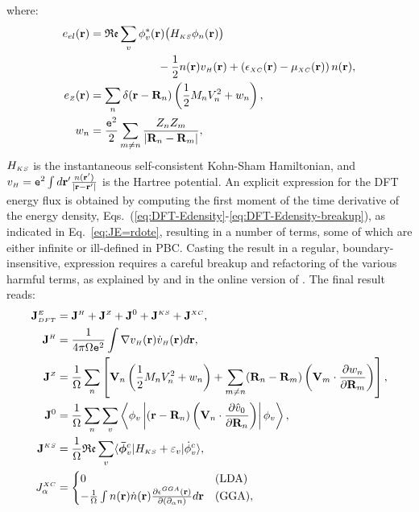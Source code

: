 where:
\begin{align}
  e_{el}(\mathbf{r}) & =\mathfrak{Re} \sum_{v}\phi_{v}^{*}(\mathbf{r})\bigl(H_{\smallKS}\phi_{n}(\mathbf{r})\bigr) \nonumber \\
  & \qquad\qquad\qquad - \frac{1}{2}n(\mathbf{r})v_{\smallH}(\mathbf{r}) +\left(\epsilon_\smallXC (\mathbf{r}) - \mu_\smallXC  (\mathbf{r}) \right) n(\mathbf{r}), \\
  e_{\smallZ}(\mathbf{r}) & = \sum_{n}\delta(\mathbf{r}-\mathbf{R}_{n}) \left(\frac{1}{2}M_{n}V_{n}^{2}+w_{n}\right), \\
  w_{n} & =\frac{\mathtt{e}^2}{2}\sum_{m\ne n}\frac{ Z_{n}Z_{m}}{|\mathbf{R}_{n}-\mathbf{R}_{m}|}, \label{eq:DFT-Edensity-breakup}
\end{align}
$H_{\scriptscriptstyle KS}$ is the instantaneous self-consistent Kohn-Sham Hamiltonian, and $v_{\scriptscriptstyle H} = \mathtt{e}^2 \int d\mathbf{r}' \frac{n(\mathbf{r}')}{|\mathbf{r}-\mathbf{r}'|}$ is the Hartree potential. An explicit expression for the DFT energy flux is obtained by computing the first moment of the time derivative of the energy density, Eqs.~(\ref{eq:DFT-Edensity}-\ref{eq:DFT-Edensity-breakup}), as indicated in Eq.~\eqref{eq:JE=rdote}, resulting in a number of terms, some of which are either infinite or ill-defined in PBC. Casting the result in a regular, boundary-insensitive, expression requires a careful breakup and refactoring of the various harmful terms, as explained by \cite{Marcolongo2014} and in the online version of \cite{Marcolongo2016}. The final result reads:
\begin{align}
  \allowdisplaybreaks
  \mathbf{J}^\smallE_{\smallDFT} &=\mathbf{J}^{\smallH} + \mathbf{J}^{\smallZ} + \mathbf{J}^{0} + \mathbf{J}^{\smallKS} +  \mathbf{J}^{\smallXC}, \\
  \mathbf{J}^{\smallH} &=
  \frac{1}{4\pi \rOmega \mathtt{e}^2}\int \nabla v_{\smallH}(\mathbf r) \dot v_{\smallH}(\mathbf  r) d\mathbf{r}, \\
  \mathbf{J}^{\smallZ} \label{eq:DFT-ionic} &=
  \frac{1}{\rOmega} \sum_{n}  \left[\mathbf{V}_{n}\left(\frac{1}{2}M_{n}V_{n}^{2} + w_{n}\right) + \sum_{m\ne n}(\mathbf{R}_{n} - \mathbf{R}_{m}) \left(\mathbf{V}_{m} \cdot \frac {\partial w_{n}}{\partial \mathbf{R}_{m}} \right) \right], \\
  \mathbf{J}^{0}  &=
  \frac{1}{\rOmega}  \sum_{n} \sum_{v}\left\langle \phi_{v} \left|(\mathbf{r}-\mathbf{R}_{n})\left(\mathbf{V}_{n}\cdot\frac{\partial\hat{v}_{0}}{\partial\mathbf{R}_{n}}\right)\right| \phi_{v}\right\rangle, \\
  \mathbf{J}^{\smallKS} &= \label{eq:DFT-KS}
  \frac{1}{\rOmega}  \mathfrak{Re} \sum_{v} \langle \bm{\bar \phi}_v^c | H_{\smallKS}+\varepsilon_v | \dot \phi_v^c \rangle, \\
  J_\alpha^{\smallXC} &=
  \begin{cases}
    0 & \mathrm{(LDA)} \\
      -\frac{1}{\rOmega} \int n(\mathbf{r}) \dot{n}(\mathbf{r}) \frac{\partial\epsilon^{\smallGGA} (\mathbf{r})}{\partial(\partial_\alpha n)} d\mathbf{r} & \mathrm{(GGA)},
  \end{cases}
\end{align}

